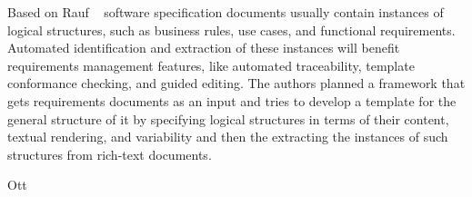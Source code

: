 Based on Rauf \etal~\cite{Rauf:2011} software specification documents usually contain instances of logical structures, such as business rules, use cases, and functional requirements. Automated identification and extraction of these instances will benefit requirements management features, like automated traceability, template conformance checking, and guided editing. The authors planned a framework that gets requirements documents as an input and tries to develop a template for the general structure of it by specifying logical structures in terms of their content, textual rendering, and variability and then the extracting the instances of such structures from rich-text documents. \newline

Ott \etal~\cite{Ott:2013}





